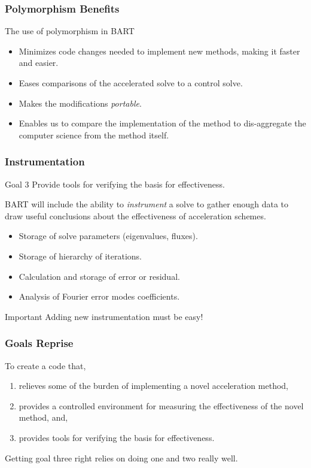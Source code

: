 \documentclass[xcolor=x11names, compress]{beamer}
\begin{document}
\begin{frame}
  \frametitle{Polymorphism Benefits}
  The use of polymorphism in BART
  \begin{itemize}
  \item<1-> Minimizes code changes needed to implement new methods,
    making it faster and easier.
  \item<2-> Eases comparisons of the accelerated solve to a
    control solve.
  \item<3-> Makes the modifications \textit{portable}.    
  \item<4-> Enables us to compare the implementation of the method to
    dis-aggregate the computer science from the method itself.
  \end{itemize}

\end{frame}
\begin{frame}
  \frametitle{Instrumentation}
  \pause
  \begin{block}{Goal 3}
    Provide tools for verifying the basis for effectiveness.
  \end{block}
  \pause
  BART will include the ability to \textit{instrument} a solve
  to gather enough data to draw useful conclusions about the effectiveness of
  acceleration schemes.
  \pause
\begin{itemize}
  \item Storage of solve parameters (eigenvalues, fluxes).
  \item Storage of hierarchy of iterations.
  \item Calculation and storage of error or residual.
  \item Analysis of Fourier error modes coefficients.
  \end{itemize}
\pause
  \begin{block}{Important}
    Adding new instrumentation must be easy!
  \end{block}
\end{frame}
\begin{frame}
  \frametitle{Goals Reprise}
  To create a code that, 
  \vspace{1em}
  \begin{enumerate}
    \setlength\itemsep{1em}
  \item relieves some of the burden of implementing a novel acceleration method,
  \item provides a controlled environment for measuring the
    effectiveness of the novel method, and,
  \item provides tools for verifying the basis for effectiveness.
  \end{enumerate}
  \pause
  \begin{block}{}
    Getting goal three right relies on doing one and two really well.
  \end{block}
\end{frame}
\end{document}
